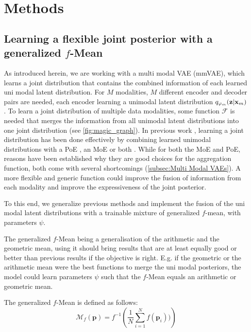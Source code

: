 \chapter{Methods}
\label{sec:methods}

\section{Learning a flexible joint posterior with a generalized $f$-Mean}
As introduced herein, we are working with a multi modal VAE (mmVAE), which learns a joint distribution that contains the combined information of each learned uni modal latent distribution.
For $M$ modalities, $M$ different encoder and decoder pairs are needed, each encoder learning a unimodal latent distribution $q_{\varphi_m}(\textbf{z}|\textbf{x}_m)$.
To learn a joint distribution of multiple data modalities, some function $\mathcal{F}$ is needed that merges the information from all unimodal latent distributions into one joint distribution (see \cref{fig:magic_graph}).
In previous work \parencite{poe,shi_variational_2019,sutter_generalized_2020}, learning a joint distribution has been done effectively by combining learned unimodal distributions with a PoE \parencite{poe}, an MoE \parencite{shi_variational_2019} or both \parencite{sutter_generalized_2020}.
While for both the MoE and PoE, reasons have been established why they are good choices for the aggregation function, both come with several shortcomings (\cref{subsec:Multi Modal VAEs}).
A more flexible and generic function could improve the fusion of information from each modality and improve the expressiveness of the joint posterior.

\smallskip

To this end, we generalize previous methods and implement the fusion of the uni modal latent distributions with a trainable mixture of generalized $f$-mean, with parameters $\psi$.

\smallskip

The generalized $f$-Mean being a generalisation of the arithmetic and the geometric mean, using it should bring results that are at least equally good or better than previous results if the objective is right.
E.g. if the geometric or the arithmetic mean were the best functions to merge the uni modal posteriors, the model could learn parameters $\psi$ such that the $f$-Mean equals an arithmetic or geometric mean.

The generalized $f$-Mean is defined as follows:
\begin{equation}
    \label{gfm}
    \mathcal{M}_{f}\left( \textbf{p} \right) = f^{-1}\left( \frac{1}{N} \sum ^N _{i=1} f(\textbf{p}_i)) \right)
\end{equation}

